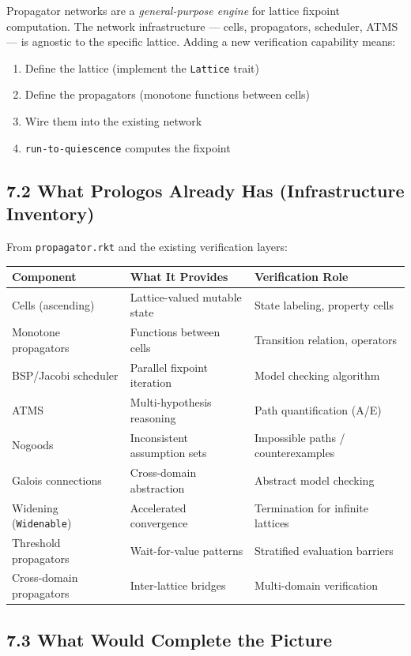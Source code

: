 \documentclass[11pt]{article}
\begin{document}
Propagator networks are a \emph{general-purpose engine} for lattice fixpoint
computation. The network infrastructure --- cells, propagators, scheduler,
ATMS --- is agnostic to the specific lattice. Adding a new verification
capability means:
\begin{enumerate}
\item Define the lattice (implement the \texttt{Lattice} trait)
\item Define the propagators (monotone functions between cells)
\item Wire them into the existing network
\item \texttt{run-to-quiescence} computes the fixpoint
\end{enumerate}
\subsection{7.2 What Prologos Already Has (Infrastructure Inventory)}
\label{sec:orgbd3a5f2}

From \texttt{propagator.rkt} and the existing verification layers:

\begin{center}
\begin{tabular}{lll}
Component & What It Provides & Verification Role\\
\hline
Cells (ascending) & Lattice-valued mutable state & State labeling, property cells\\
Monotone propagators & Functions between cells & Transition relation, operators\\
BSP/Jacobi scheduler & Parallel fixpoint iteration & Model checking algorithm\\
ATMS & Multi-hypothesis reasoning & Path quantification (A/E)\\
Nogoods & Inconsistent assumption sets & Impossible paths / counterexamples\\
Galois connections & Cross-domain abstraction & Abstract model checking\\
Widening (\texttt{Widenable}) & Accelerated convergence & Termination for infinite lattices\\
Threshold propagators & Wait-for-value patterns & Stratified evaluation barriers\\
Cross-domain propagators & Inter-lattice bridges & Multi-domain verification\\
\end{tabular}
\end{center}
\subsection{7.3 What Would Complete the Picture}
\label{sec:orgc48f1a0}
\end{document}
